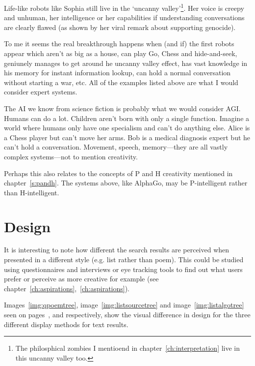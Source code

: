 Life-like robots like Sophia still live in the `uncanny valley'\footnote{The philosphical zombies I mentioend in chapter~\ref{ch:interpretation} live in this uncanny valley too.}. Her voice is creepy and unhuman, her intelligence or her capabilities if understanding conversations are clearly flawed (as shown by her viral remark about supporting genocide).

\spirals

To me it seems the real breakthrough happens when (and if) the first robots appear which aren't as big as a house, can play Go, Chess and hide-and-seek, geniunely manages to get around he uncanny valley effect, has vast knowledge in his memory for instant information lookup, can hold a normal conversation without starting a war, etc. All of the examples listed above are what I would consider expert systems. 

The \ac{AI} we know from science fiction is probably what we would consider \ac{AGI}. Humans can do a lot. Children aren't born with only a single function. Imagine a world where humans only have one specialism and can't do anything else. Alice is a Chess player but can't move her arms. Bob is a medical diagnosis expert but he can't hold a conversation. Movement, speech, memory---they are all vastly complex systems---not to mention creativity.

Perhaps this also relates to the concepts of P and H creativity mentioned in chapter~\ref{s:pandh}. The systems above, like AlphaGo, may be P-intelligent rather than H-intelligent.


\section{Design}

It is interesting to note how different the search results are perceived when presented in a different style (e.g. list rather than poem). This could be studied using questionnaires and interviews or eye tracking tools to find out what users prefer or perceive as more creative for example (see chapter~\ref{ch:aspirations},~\ref{ch:aspirations}). 

Images~\ref{img:qpoemtree}, image~\ref{img:listsourcetree} and image~\ref{img:listalgotree} seen on pages~\pageref{img:qpoemtree},\pageref{img:listsourcetree} and \pageref{img:qpoemtree} respectively, show the visual difference in design for the three different display methods for text results.

